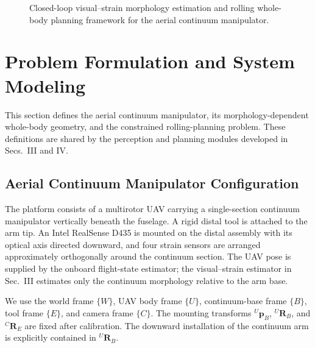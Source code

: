 \documentclass[journal,twoside]{IEEEtran}
\begin{document}
\begin{figure}[t]
    \centering
    \caption{Closed-loop visual--strain morphology estimation and rolling whole-body planning framework for the aerial continuum manipulator.}
    \label{fig:framework}
\end{figure}

\section{Problem Formulation and System Modeling}
This section defines the aerial continuum manipulator, its morphology-dependent whole-body geometry, and the constrained rolling-planning problem. These definitions are shared by the perception and planning modules developed in Secs.~III and IV.

\subsection{Aerial Continuum Manipulator Configuration}
The platform consists of a multirotor UAV carrying a single-section continuum manipulator vertically beneath the fuselage. A rigid distal tool is attached to the arm tip. An Intel RealSense D435 is mounted on the distal assembly with its optical axis directed downward, and four strain sensors are arranged approximately orthogonally around the continuum section. The UAV pose is supplied by the onboard flight-state estimator; the visual--strain estimator in Sec.~III estimates only the continuum morphology relative to the arm base.

We use the world frame $\{W\}$, UAV body frame $\{U\}$, continuum-base frame $\{B\}$, tool frame $\{E\}$, and camera frame $\{C\}$. The mounting transforms ${}^{U}\mathbf p_B$, ${}^{U}\mathbf R_B$, and ${}^{C}\mathbf R_E$ are fixed after calibration. The downward installation of the continuum arm is explicitly contained in ${}^{U}\mathbf R_B$.
\end{document}
